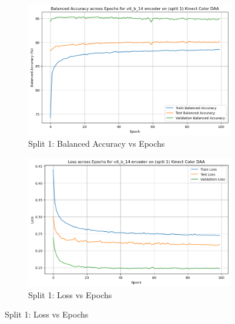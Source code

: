 \begin{figure}[htbp]
    \begin{subfigure}[b]{0.45\textwidth}
        \includegraphics[width=\textwidth]{Images_Thesis/Tensboard_runs_images_all/Experiment_02_Sel_Sup_D_A_no_Aug/Split_1/output_bal_acc_split_1_d_a_ssl.png}
        \caption{Split 1: Balanced Accuracy vs Epochs}
        \label{fig:Exp_3_03}
    \end{subfigure}
    \hfill
    \begin{subfigure}[b]{0.45\textwidth}
        \includegraphics[width=\textwidth]{Images_Thesis/Tensboard_runs_images_all/Experiment_02_Sel_Sup_D_A_no_Aug/Split_1/output_loss_split_1_d_a_ssl.png}
        \caption{Split 1:  Loss vs Epochs}
        \label{fig:Exp_3_04}
    \end{subfigure}


\end{figure}
